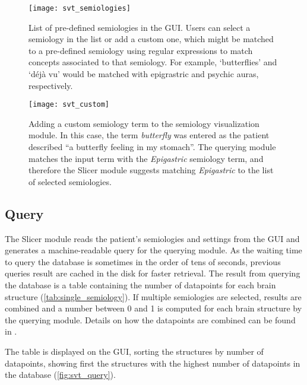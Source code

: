 \begin{figure}
  \centering
  \texttt{[image: svt\_semiologies]}
  \caption[List of pre-defined semiologies in the GUI]{
    List of pre-defined semiologies in the \ac{GUI}.
    Users can select a semiology in the list or add a custom one, which might be matched to a pre-defined semiology using regular expressions to match concepts associated to that semiology.
    For example, `butterflies' and `déjà vu' would be matched with epigrastric and psychic auras, respectively.
  }
  \label{fig:svt_semiologies}
\end{figure}

\begin{figure}
  \centering
  \texttt{[image: svt\_custom]}
  \caption[Adding a custom semiology term to the semiology visualization module]{
    Adding a custom semiology term to the semiology visualization module.
    In this case, the term \textit{butterfly} was entered as the patient described ``a butterfly feeling in my stomach''.
    The querying module matches the input term with the \textit{Epigastric} semiology term, and therefore the Slicer module suggests matching \textit{Epigastric} to the list of selected semiologies.
  }
  \label{fig:svt_custom}
\end{figure}


\subsection{Query}

The Slicer module reads the patient's semiologies and settings from the \ac{GUI} and generates a machine-readable query for the querying module.
As the waiting time to query the database is sometimes in the order of tens of seconds, previous queries result are cached in the disk for faster retrieval.
The result from querying the database is a table containing the number of datapoints for each brain structure (\cref{tab:single_semiology}).
If multiple semiologies are selected, results are combined and a number between 0 and 1 is computed for each brain structure by the querying module.
Details on how the datapoints are combined can be found in \cite{alim-marvasti_mapping_2021}.

The table is displayed on the \ac{GUI}, sorting the structures by number of datapoints, showing first the structures with the highest number of datapoints in the database (\cref{fig:svt_query}).

